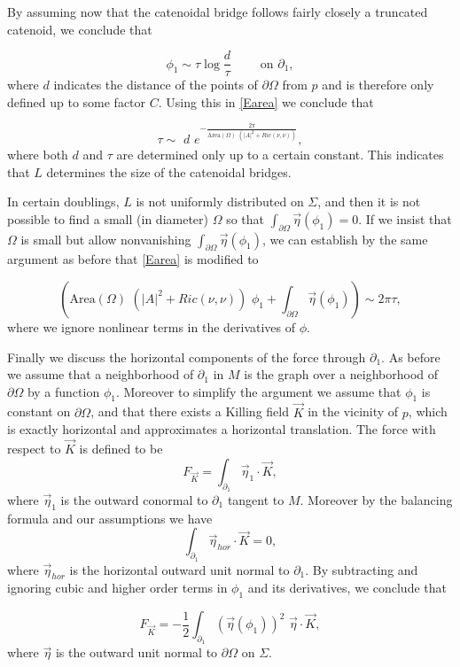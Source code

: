 \documentclass[12pt,namelimits,sumlimits]{amsart}
\theoremstyle{remark}
\numberwithin{equation}{section}
\begin{document}
By assuming now that the catenoidal bridge follows fairly closely
a trunca\-ted ca\-te\-no\-id,
we conclude that 
\addtocounter{theorem}{1}
\begin{equation}
\label{Eheight}
\phi_1\sim\tau\log\frac{d}{\tau}
\qquad
\text{ on }
\partial_1,
\end{equation}
where $d$ indicates the distance of the points of $\partial\Omega$ from $p$
and is therefore only defined up to some factor $C$.
Using this in \ref{Earea} we conclude that 
\addtocounter{theorem}{1}
\begin{equation}
\label{Etau}
\tau\sim \,\, d  \,\,    e^{-\frac{2\pi}{ \text{Area}(\Omega)\,\, (|A|^2+Ric(\nu,\nu))  }},
\end{equation}
where both $d$ and $\tau$ are determined only up to a certain constant.
This indicates that $L$ determines the size of the catenoidal bridges.

In certain doublings,
$L$ is not uniformly distributed on $\Sigma$,
and then it is not possible to find a small (in diameter) $\Omega$ so that
$\int_{\partial\Omega}\vec{\eta}(\phi_1)=0$.
If we insist that $\Omega$ is small but allow nonvanishing $\int_{\partial\Omega}\vec{\eta}(\phi_1)$,
we can establish by the same argument as before that
\ref{Earea} is modified to 
\addtocounter{theorem}{1}
\begin{equation}
\label{Evertical}
\left(
\text{Area}(\Omega)\,\, (|A|^2+Ric(\nu,\nu))\,\,\phi_1
+\int_{\partial\Omega}\vec{\eta}(\phi_1)
\right)
\sim 2\pi\tau,
\end{equation}
where we ignore nonlinear terms in the derivatives of $\phi$.

Finally we discuss the horizontal components of the force through $\partial_1$.
As before we assume that a neighborhood of $\partial_1$ in $M$ is the graph over a neighborhood of
$\partial\Omega$ by a function $\phi_1$.
Moreover to simplify the argument we assume that $\phi_1$ is constant on $\partial\Omega$,
and that there exists a Killing field ${{\vec{K}}}$ in the vicinity of $p$,
which is exactly horizontal and approximates a horizontal translation.
The force with respect to ${{\vec{K}}}$ is defined to be
$$
F_{{\vec{K}}}=\int_{\partial_1}\vec{\eta}_1\cdot{{\vec{K}}},
$$
where $\vec{\eta}_1$ is the outward conormal to $\partial_1$ tangent to $M$.
Moreover by the balancing formula and our assumptions we have
$$
\int_{\partial_1}\vec{\eta}_{hor}\cdot{{\vec{K}}}=0,
$$
where $\vec{\eta}_{hor}$ is the horizontal outward unit normal to $\partial_1$.
By subtracting and ignoring cubic and higher order terms in $\phi_1$ and its derivatives,
we conclude that
\addtocounter{theorem}{1}
\begin{equation}
\label{Ehorizontal}
F_{{\vec{K}}}=-\frac12\int_{\partial_1}
(\vec{\eta}(\phi_1))^2
\,\,\vec{\eta}\cdot{{\vec{K}}},
\end{equation}
where $\vec\eta$ is the outward unit normal to $\partial\Omega$ on $\Sigma$.
\end{document}
